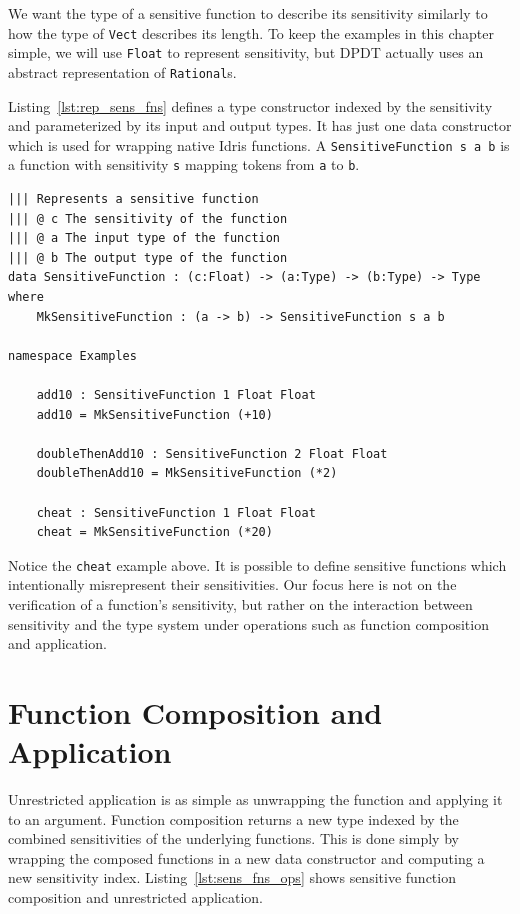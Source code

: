 \documentclass[12pt]{report}
\begin{document}
We want the type of a sensitive function to describe its sensitivity similarly to how the type of \texttt{Vect} describes its length.
To keep the examples in this chapter simple, we will use \texttt{Float} to represent sensitivity, but DPDT actually uses an abstract representation of \texttt{Rational}s.

Listing~\ref{lst:rep_sens_fns} defines a type constructor indexed by the sensitivity and parameterized by its input and output types.
It has just one data constructor which is used for wrapping native Idris functions.
A \texttt{SensitiveFunction s a b} is a function with sensitivity \texttt{s} mapping tokens from \texttt{a} to \texttt{b}.

\begin{lstlisting}[float,caption={Representing sensitive functions},label={lst:rep_sens_fns}]
||| Represents a sensitive function
||| @ c The sensitivity of the function
||| @ a The input type of the function
||| @ b The output type of the function
data SensitiveFunction : (c:Float) -> (a:Type) -> (b:Type) -> Type where
    MkSensitiveFunction : (a -> b) -> SensitiveFunction s a b

namespace Examples

    add10 : SensitiveFunction 1 Float Float
    add10 = MkSensitiveFunction (+10)

    doubleThenAdd10 : SensitiveFunction 2 Float Float
    doubleThenAdd10 = MkSensitiveFunction (*2)

    cheat : SensitiveFunction 1 Float Float
    cheat = MkSensitiveFunction (*20)
\end{lstlisting}

Notice the \texttt{cheat} example above.
It is possible to define sensitive functions which intentionally misrepresent their sensitivities.
Our focus here is not on the verification of a function's sensitivity, but rather on the interaction between sensitivity and the type system under operations such as function composition and application.

\section{Function Composition and Application}

Unrestricted application is as simple as unwrapping the function and applying it to an argument.
Function composition returns a new type indexed by the combined sensitivities of the underlying functions.
This is done simply by wrapping the composed functions in a new data constructor and computing a new sensitivity index.
Listing~\ref{lst:sens_fns_ops} shows sensitive function composition and unrestricted application.
\end{document}
